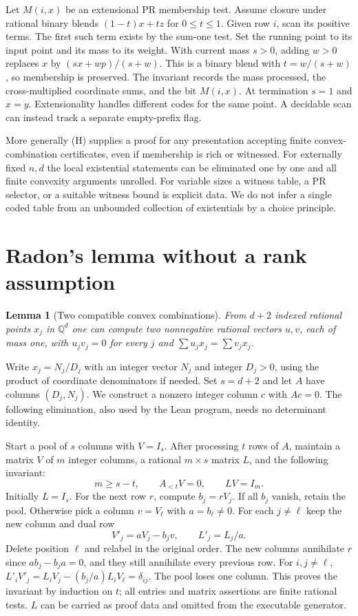 \documentclass[11pt,letterpaper]{article}
\newcommand{\Q}{\mathbb Q}\newcommand{\R}{\mathbb R}\newcommand{\N}{\mathbb N}
\newcommand{\key}[1]{\smallskip\noindent{\sffamily\bfseries\color{ink}#1}\enspace}
\theoremstyle{packet}\newtheorem{theorem}{Theorem}\newtheorem{lem}[theorem]{Lemma}
\newcommand{\head}[1]{\section{#1}}
\begin{document}
\key{From binary convexity to row membership.} Let $M(i,x)$ be an extensional PR membership test. Assume closure under rational binary blends $(1-t)x+tz$ for $0\le t\le1$. Given row $i$, scan its positive terms. The first such term exists by the sum-one test. Set the running point to its input point and its mass to its weight. With current mass $s>0$, adding $w>0$ replaces $x$ by $(s x+w p)/(s+w)$. This is a binary blend with $t=w/(s+w)$, so membership is preserved. The invariant records the mass processed, the cross-multiplied coordinate sums, and the bit $M(i,x)$. At termination $s=1$ and $x=y$. Extensionality handles different codes for the same point. A decidable scan can instead track a separate empty-prefix flag.

More generally (H) supplies a proof for any presentation accepting finite convex-combination certificates, even if membership is rich or witnessed. For externally fixed $n,d$ the local existential statements can be eliminated one by one and all finite convexity arguments unrolled. For variable sizes a witness table, a PR selector, or a suitable witness bound is explicit data. We do not infer a single coded table from an unbounded collection of existentials by a choice principle.

\newpage
\head{Radon's lemma without a rank assumption}\label{sec:radon}

\begin{lem}[Two compatible convex combinations]\label{lem:radon}
From $d+2$ indexed rational points $x_j$ in $\Q^d$ one can compute two nonnegative rational vectors $u,v$, each of mass one, with
$u_j v_j=0$ for every $j$ and $\sum u_jx_j=\sum v_jx_j$.
\end{lem}

Write $x_j=N_j/D_j$ with an integer vector $N_j$ and integer $D_j>0$, using the product of coordinate denominators if needed. Set $s=d+2$ and let $A$ have columns $(D_j,N_j)$. We construct a nonzero integer column $c$ with $Ac=0$. The following elimination, also used by the Lean program, needs no determinant identity.

Start a pool of $s$ columns with $V=I_s$. After processing $t$ rows of $A$, maintain a matrix $V$ of $m$ integer columns, a rational $m\times s$ matrix $L$, and the following invariant:
\[
  m\ge s-t,\qquad A_{<t}V=0,\qquad LV=I_m .
\]
Initially $L=I_s$. For the next row $r$, compute $b_j=r V_j$. If all $b_j$ vanish, retain the pool. Otherwise pick a column $v=V_\ell$ with $a=b_\ell\ne0$. For each $j\ne\ell$ keep the new column and dual row
\[
          V'_j=a V_j-b_jv,\qquad L'_j=L_j/a.
\]
Delete position $\ell$ and relabel in the original order. The new columns annihilate $r$ since $ab_j-b_ja=0$, and they still annihilate every previous row. For $i,j\ne\ell$,
$L'_i V'_j=L_i V_j-(b_j/a)L_iV_\ell=\delta_{ij}$.
The pool loses one column. This proves the invariant by induction on $t$; all entries and matrix assertions are finite rational tests. $L$ can be carried as proof data and omitted from the executable generator.
\end{document}
